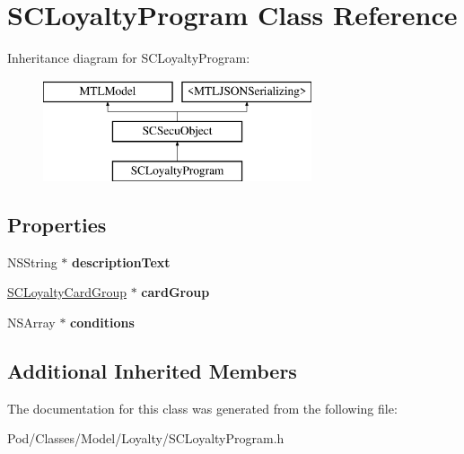 \hypertarget{interface_s_c_loyalty_program}{}\section{S\+C\+Loyalty\+Program Class Reference}
\label{interface_s_c_loyalty_program}
Inheritance diagram for S\+C\+Loyalty\+Program\+:\begin{figure}[H]
\begin{center}
\leavevmode
\includegraphics[height=3.000000cm]{interface_s_c_loyalty_program}
\end{center}
\end{figure}
\subsection*{Properties}
\begin{DoxyCompactItemize}
\item 
N\+S\+String $\ast$ {\bfseries description\+Text}\hypertarget{interface_s_c_loyalty_program_a2286f505c4e216b5062fea621eba632c}{}\label{interface_s_c_loyalty_program_a2286f505c4e216b5062fea621eba632c}

\item 
\hyperlink{interface_s_c_loyalty_card_group}{S\+C\+Loyalty\+Card\+Group} $\ast$ {\bfseries card\+Group}\hypertarget{interface_s_c_loyalty_program_a9550c3c52b3cf693e68b08ff6bc2af42}{}\label{interface_s_c_loyalty_program_a9550c3c52b3cf693e68b08ff6bc2af42}

\item 
N\+S\+Array $\ast$ {\bfseries conditions}\hypertarget{interface_s_c_loyalty_program_adfe9022b3c01aa74343b3629c5a2c1de}{}\label{interface_s_c_loyalty_program_adfe9022b3c01aa74343b3629c5a2c1de}

\end{DoxyCompactItemize}
\subsection*{Additional Inherited Members}


The documentation for this class was generated from the following file\+:\begin{DoxyCompactItemize}
\item 
Pod/\+Classes/\+Model/\+Loyalty/S\+C\+Loyalty\+Program.\+h\end{DoxyCompactItemize}
